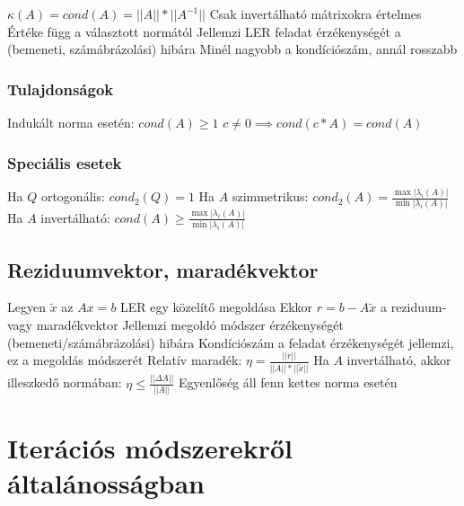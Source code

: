 \documentclass[12pt,a4paper]{article}
\begin{document}
\begin{outline}
	\1 $\kappa(A) = cond(A) = ||A||*||A^{-1}||$
	\1 Csak invertálható mátrixokra értelmes
	\1 Értéke függ a választott normától
	\1 Jellemzi LER feladat érzékenységét a (bemeneti, számábrázolási) hibára
		\2 Minél nagyobb a kondíciószám, annál rosszabb
\end{outline}

\subsubsection{Tulajdonságok}

\begin{outline}
	\1 Indukált norma esetén: $cond(A) \ge 1$
	\1 $c \ne 0 \implies cond(c*A) = cond(A)$
\end{outline}

\subsubsection{Speciális esetek}

\begin{outline}
	\1 Ha $Q$ ortogonális: $cond_2(Q) = 1$
	\1 Ha $A$ szimmetrikus: $cond_2(A) = \frac{\max |\lambda_i(A)|}{\min |\lambda_i(A)|}$
	\1 Ha $A$ invertálható: $cond(A) \ge \frac{\max |\lambda_i(A)|}{\min |\lambda_i(A)|}$
\end{outline}

\subsection{Reziduumvektor, maradékvektor}

\begin{outline}
	\1 Legyen $\widetilde{x}$ az $Ax=b$ LER egy közelítő megoldása
	\1 Ekkor $r = b - A \widetilde{x}$ a reziduum- vagy maradékvektor
	\1 Jellemzi megoldó módszer érzékenységét (bemeneti/számábrázolási) hibára
		\2 Kondíciószám a feladat érzékenységét jellemzi, ez a megoldás módszerét
	\1 Relatív maradék: $\eta = \frac{||r||}{||A||*||\widetilde{x}||}$
		\2 Ha $A$ invertálható, akkor illeszkedő normában: $\eta \le \frac{||\Delta A||}{||A||}$
		\2 Egyenlőség áll fenn kettes norma esetén
\end{outline}

\pagebreak

\section{Iterációs módszerekről általánosságban}
\end{document}
